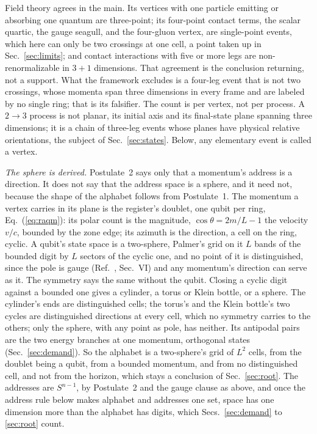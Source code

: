 \documentclass[aps,prd,twocolumn,superscriptaddress,nofootinbib]{revtex4-2}
\begin{document}
Field theory agrees in the main. Its vertices with one particle emitting or absorbing one quantum are three-point; its four-point contact terms, the scalar quartic, the gauge seagull, and the four-gluon vertex, are single-point events, which here can only be two crossings at one cell, a point taken up in Sec.~\ref{sec:limits}; and contact interactions with five or more legs are non-renormalizable in $3+1$ dimensions. That agreement is the conclusion returning, not a support. What the framework excludes is a four-leg event that is not two crossings, whose momenta span three dimensions in every frame and are labeled by no single ring; that is its falsifier. The count is per vertex, not per process. A $2\to3$ process is not planar, its initial axis and its final-state plane spanning three dimensions; it is a chain of three-leg events whose planes have physical relative orientations, the subject of Sec.~\ref{sec:states}. Below, any elementary event is called a vertex.

\textit{The sphere is derived.} Postulate~2 says only that a momentum's address is a direction. It does not say that the address space is a sphere, and it need not, because the shape of the alphabet follows from Postulate~1. The momentum a vertex carries in its plane is the register's doublet, one qubit per ring, Eq.~(\ref{eq:raqm}): its polar count is the magnitude, $\cos\theta = 2m/L-1$ the velocity $v/c$, bounded by the zone edge; its azimuth is the direction, a cell on the ring, cyclic. A qubit's state space is a two-sphere, Palmer's grid on it $L$ bands of the bounded digit by $L$ sectors of the cyclic one, and no point of it is distinguished, since the pole is gauge (Ref.~\cite{korytko2026c}, Sec.~VI) and any momentum's direction can serve as it. The symmetry says the same without the qubit. Closing a cyclic digit against a bounded one gives a cylinder, a torus or Klein bottle, or a sphere. The cylinder's ends are distinguished cells; the torus's and the Klein bottle's two cycles are distinguished directions at every cell, which no symmetry carries to the others; only the sphere, with any point as pole, has neither. Its antipodal pairs are the two energy branches at one momentum, orthogonal states (Sec.~\ref{sec:demand}). So the alphabet is a two-sphere's grid of $L^2$ cells, from the doublet being a qubit, from a bounded momentum, and from no distinguished cell, and not from the horizon, which stays a conclusion of Sec.~\ref{sec:root}. The addresses are $S^{n-1}$, by Postulate~2 and the gauge clause as above, and once the address rule below makes alphabet and addresses one set, space has one dimension more than the alphabet has digits, which Secs.~\ref{sec:demand} to \ref{sec:root} count.
\end{document}
